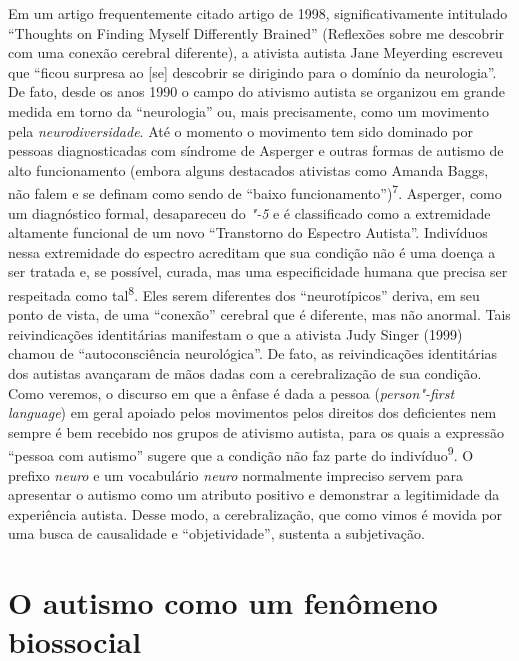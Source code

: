 Em um artigo frequentemente citado artigo de 1998, significativamente
intitulado ``Thoughts on Finding Myself Differently Brained'' (Reflexões
sobre me descobrir com uma conexão cerebral diferente), a ativista
autista Jane Meyerding escreveu que ``ficou surpresa ao {[}se{]}
descobrir se dirigindo para o domínio da neurologia''. De fato, desde os
anos 1990 o campo do ativismo autista se organizou em grande medida em
torno da ``neurologia'' ou, mais precisamente, como um movimento pela
\emph{neurodiversidade}. Até o momento o movimento tem sido dominado por
pessoas diagnosticadas com síndrome de Asperger e outras formas de
autismo de alto funcionamento (embora alguns destacados ativistas como
Amanda Baggs, não falem e se definam como sendo de ``baixo
funcionamento'')\textsuperscript{7}. Asperger, como um diagnóstico
formal, desapareceu do \emph{"-5} e é classificado como a extremidade
altamente funcional de um novo ``Transtorno do Espectro Autista''.
Indivíduos nessa extremidade do espectro acreditam que sua condição não
é uma doença a ser tratada e, se possível, curada, mas uma
especificidade humana que precisa ser respeitada como
tal\textsuperscript{8}. Eles serem diferentes dos ``neurotípicos''
deriva, em seu ponto de vista, de uma ``conexão'' cerebral que é
diferente, mas não anormal. Tais reivindicações identitárias manifestam
o que a ativista Judy Singer (1999) chamou de ``autoconsciência
neurológica''. De fato, as reivindicações identitárias dos autistas
avançaram de mãos dadas com a cerebralização de sua condição. Como
veremos, o discurso em que a ênfase é dada a pessoa (\emph{person"-first
language}) em geral apoiado pelos movimentos pelos direitos dos
deficientes nem sempre é bem recebido nos grupos de ativismo autista,
para os quais a expressão ``pessoa com autismo'' sugere que a condição
não faz parte do indivíduo\textsuperscript{9}. O prefixo \emph{neuro} e
um vocabulário \emph{neuro} normalmente impreciso servem para apresentar
o autismo como um atributo positivo e demonstrar a legitimidade da
experiência autista. Desse modo, a cerebralização, que como vimos é
movida por uma busca de causalidade e ``objetividade'', sustenta a
subjetivação.

\chapter{O autismo como um fenômeno biossocial}

